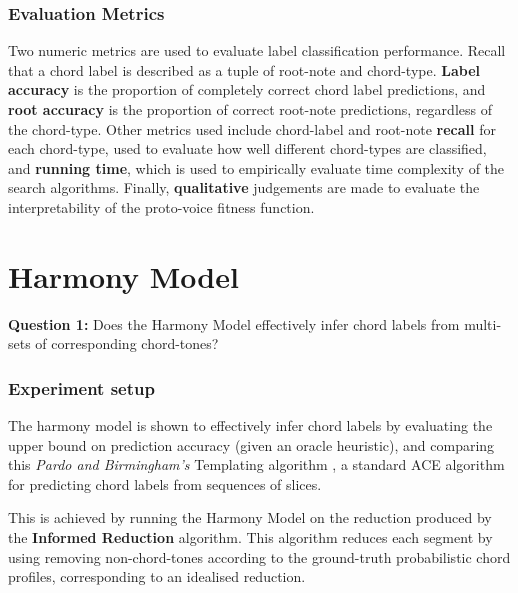 \documentclass[12pt,a4paper,twoside,openany]{report} \usepackage[pdfborder={0 0 0}]{hyperref}    %
\theoremstyle{definition} \newtheorem{definition}{Definition}[section]
\begin{document}
\subsubsection{Evaluation Metrics}

Two numeric metrics are used to evaluate label classification performance. Recall that a chord label is described as
a tuple of root-note and chord-type. \textbf{Label accuracy} is the proportion of completely correct chord label
predictions, and \textbf{root accuracy} is the proportion of correct root-note predictions, regardless of the
chord-type. Other metrics used include chord-label and root-note \textbf{recall} for each chord-type, used to evaluate
how well different chord-types are classified, and \textbf{running time}, which is used to empirically evaluate time complexity of the
search algorithms. Finally, \textbf{qualitative} judgements are made to evaluate the interpretability of the proto-voice fitness
function.

  \section{Harmony Model}
  \label{sec:evalHarmony}
  \textbf{Question 1: }Does the Harmony Model effectively infer chord labels from multi-sets of corresponding chord-tones?
  \subsubsection{Experiment setup}
  The harmony model is shown to effectively infer chord labels by evaluating the upper bound on prediction
  accuracy (given an oracle heuristic), and comparing this \textit{Pardo and Birmingham's} Templating algorithm \cite{pardoAlgorithmsChordalAnalysis2002},
  a standard ACE algorithm for predicting chord labels from sequences of slices.  

  This is achieved by running the Harmony Model on the reduction produced by the \textbf{Informed Reduction} algorithm.
  This algorithm reduces each segment by using removing non-chord-tones according to the ground-truth probabilistic
  chord profiles, corresponding to an idealised reduction. 
\end{document}
